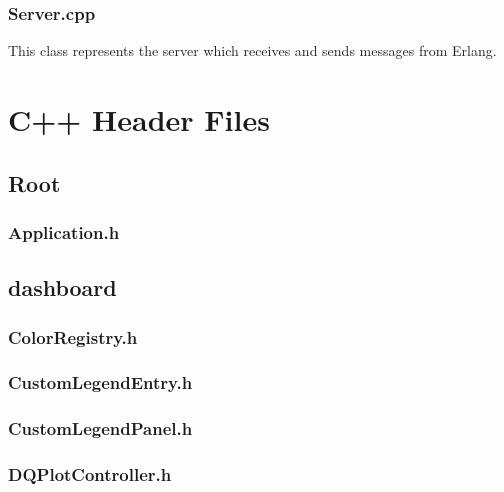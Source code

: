 \subsection{Server.cpp} \label{code:serv}
This class represents the server which receives and sends messages from Erlang.


\chapter{C++ Header Files}

\section{Root}

\subsection{Application.h}


\section{dashboard}

\subsection{ColorRegistry.h}


\subsection{CustomLegendEntry.h}


\subsection{CustomLegendPanel.h}


\subsection{DQPlotController.h}


